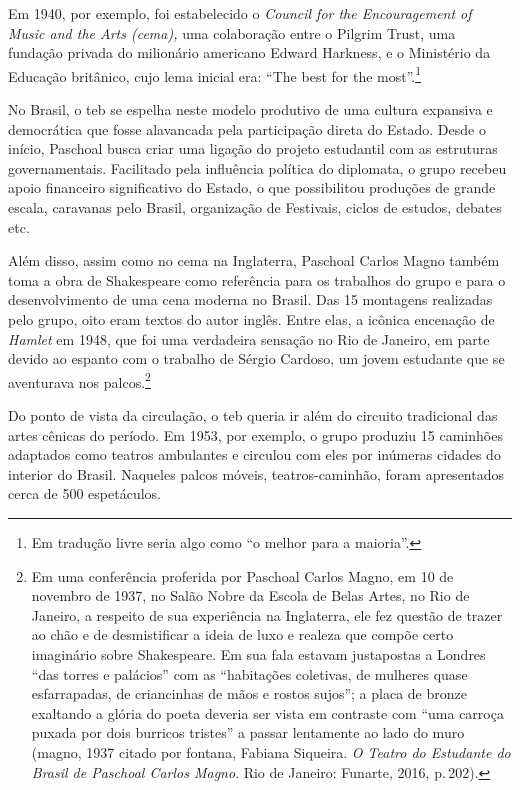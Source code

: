Em 1940, por exemplo, foi estabelecido o {\it Council for the
Encouragement of Music and the Arts ({\sc cema}),} uma colaboração entre o
Pilgrim Trust, uma fundação privada do milionário americano Edward
Harkness, e o Ministério da Educação britânico, cujo lema inicial era:
“The best for the most”.\footnote{Em tradução livre seria algo como “o
  melhor para a maioria”.}

No Brasil, o {\sc teb} se espelha neste modelo produtivo de uma cultura
expansiva e democrática que fosse alavancada pela participação direta do
Estado. Desde o início, Paschoal busca criar uma ligação do projeto
estudantil com as estruturas governamentais. Facilitado pela influência
política do diplomata, o grupo recebeu apoio financeiro significativo do
Estado, o que possibilitou produções de grande escala, caravanas pelo
Brasil, organização de Festivais, ciclos de estudos, debates etc.

Além disso, assim como no {\sc cema} na Inglaterra, Paschoal Carlos Magno
também toma a obra de Shakespeare como referência para os trabalhos do
grupo e para o desenvolvimento de uma cena moderna no Brasil. Das 15
montagens realizadas pelo grupo, oito eram textos do autor inglês. Entre
elas, a icônica encenação de {\it Hamlet} em 1948, que foi uma
verdadeira sensação no Rio de Janeiro, em parte devido ao espanto com o
trabalho de Sérgio Cardoso, um jovem estudante que se aventurava nos
palcos.\footnote{Em uma conferência proferida por Paschoal Carlos Magno,
  em 10 de novembro de 1937, no Salão Nobre da Escola de Belas Artes, no
  Rio de Janeiro, a respeito de sua experiência na Inglaterra, ele fez
  questão de trazer ao chão e de desmistificar a ideia de luxo e realeza
  que compõe certo imaginário sobre Shakespeare. Em sua fala estavam
  justapostas a Londres “das torres e palácios” com as “habitações
  coletivas, de mulheres quase esfarrapadas, de criancinhas de mãos e
  rostos sujos”; a placa de bronze exaltando a glória do poeta deveria
  ser vista em contraste com “uma carroça puxada por dois burricos
  tristes” a passar lentamente ao lado do muro ({\sc magno}, 1937 citado por
  {\sc fontana}, Fabiana Siqueira. {\it O Teatro do Estudante do Brasil de
  Paschoal Carlos Magno}. Rio de Janeiro: Funarte, 2016, p.\,202).}

Do ponto de vista da circulação, o {\sc teb} queria ir além do circuito
tradicional das artes cênicas do período. Em 1953, por exemplo, o grupo
produziu 15 caminhões adaptados como teatros ambulantes e circulou com
eles por inúmeras cidades do interior do Brasil. Naqueles palcos móveis,
teatros-caminhão, foram apresentados cerca de 500 espetáculos.

